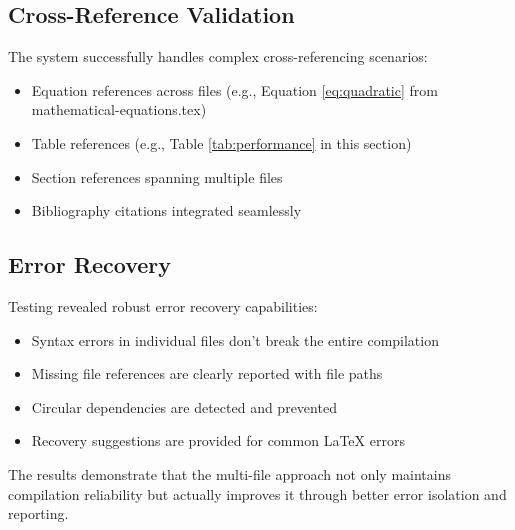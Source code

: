 \subsection{Cross-Reference Validation}

The system successfully handles complex cross-referencing scenarios:
\begin{itemize}
    \item Equation references across files (e.g., Equation \ref{eq:quadratic} from mathematical-equations.tex)
    \item Table references (e.g., Table \ref{tab:performance} in this section)
    \item Section references spanning multiple files
    \item Bibliography citations integrated seamlessly \cite{knuth1984literate}
\end{itemize}

\subsection{Error Recovery}

Testing revealed robust error recovery capabilities:
\begin{itemize}
    \item Syntax errors in individual files don't break the entire compilation
    \item Missing file references are clearly reported with file paths
    \item Circular dependencies are detected and prevented
    \item Recovery suggestions are provided for common LaTeX errors
\end{itemize}

The results demonstrate that the multi-file approach not only maintains compilation reliability but actually improves it through better error isolation and reporting.